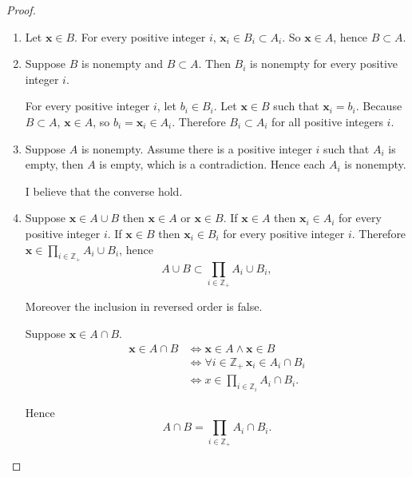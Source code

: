 \begin{proof}
    \begin{enumerate}[label={(\alph*)}]
        \item Let $\mathbf{x}\in B$. For every positive integer $i$, $\mathbf{x}_{i}\in B_{i}\subset A_{i}$. So $\mathbf{x}\in A$, hence $B\subset A$.
        \item Suppose $B$ is nonempty and $B\subset A$. Then $B_{i}$ is nonempty for every positive integer $i$.

              For every positive integer $i$, let $b_{i}\in B_{i}$. Let $\mathbf{x}\in B$ such that $\mathbf{x}_{i} = b_{i}$. Because $B\subset A$, $\mathbf{x}\in A$, so $b_{i} = \mathbf{x}_{i}\in A_{i}$. Therefore $B_{i}\subset A_{i}$ for all positive integers $i$.
        \item Suppose $A$ is nonempty. Assume there is a positive integer $i$ such that $A_{i}$ is empty, then $A$ is empty, which is a contradiction. Hence each $A_{i}$ is nonempty.

              I believe that the converse hold.
        \item Suppose $\mathbf{x}\in A\cup B$ then $\mathbf{x}\in A$ or $\mathbf{x}\in B$. If $\mathbf{x}\in A$ then $\mathbf{x}_{i}\in A_{i}$ for every positive integer $i$.  If $\mathbf{x}\in B$ then $\mathbf{x}_{i}\in B_{i}$ for every positive integer $i$. Therefore $\mathbf{x}\in\prod_{i\in\mathbb{Z}_{+}}A_{i}\cup B_{i}$, hence
              \[
                  A\cup B \subset \prod_{i\in\mathbb{Z}_{+}}A_{i}\cup B_{i},
              \]

              Moreover the inclusion in reversed order is false.

              Suppose $\mathbf{x}\in A\cap B$.
              \begin{align*}
                  \mathbf{x}\in A\cap B & \Longleftrightarrow \mathbf{x}\in A\land \mathbf{x}\in B                          \\
                                        & \Longleftrightarrow \forall i\in\mathbb{Z}_{+}\,\mathbf{x}_{i}\in A_{i}\cap B_{i} \\
                                        & \Longleftrightarrow x\in\prod_{i\in\mathbb{Z}_{i}}A_{i}\cap B_{i}.
              \end{align*}

              Hence
              \[
                  A\cap B = \prod_{i\in\mathbb{Z}_{+}}A_{i}\cap B_{i}.
              \]
    \end{enumerate}
\end{proof}

